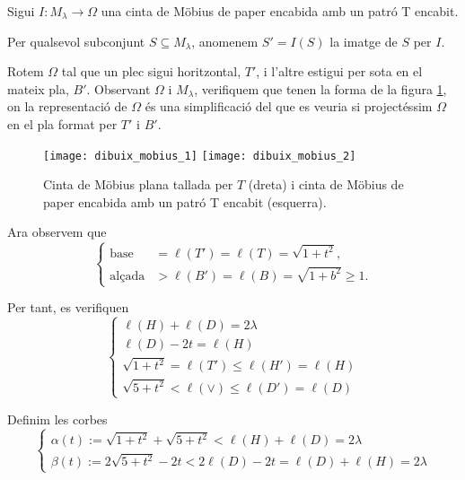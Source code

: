 Sigui $I:M_\lambda\to\Omega$ una cinta de Möbius de paper encabida amb un patró T encabit.
\begin{nota}
    Per qualsevol subconjunt $S\subseteq M_\lambda$, anomenem $S'=I(S)$ la imatge de $S$ per $I$.
\end{nota}

Rotem $\Omega$ tal que un plec sigui horitzontal, $T'$, i l'altre estigui per sota en el mateix pla, $B'$. Observant $\Omega$ i $M_\lambda$, verifiquem que tenen la forma de la figura \ref{fig:mobius_1}, on la representació de $\Omega$ és una simplificació del que es veuria si projectéssim $\Omega$ en el pla format per $T'$ i $B'$.

\begin{figure}[htbp]
    \centering
    \texttt{[image: dibuix\_mobius\_1]}
    \quad
    \quad
    \texttt{[image: dibuix\_mobius\_2]}
    \caption{Cinta de Möbius plana tallada per $T$ (dreta) i cinta de Möbius de paper encabida amb un patró T encabit (esquerra).}
    \label{fig:mobius_1}
\end{figure}

Ara observem que 
\begin{equation*}
    \begin{cases}
        \text{base} &= \ell(T') = \ell(T) = \sqrt{1+t^2},\\
        \text{alçada} &> \ell(B') = \ell(B) = \sqrt{1+b^2}\ge1.
    \end{cases}
\end{equation*}

Per tant, es verifiquen
\begin{equation*}
    \begin{cases}
        \ell(H) + \ell(D) = 2\lambda\\
        \ell(D)-2t=\ell(H)\\
        \sqrt{1+t^2}=\ell(T')\le\ell(H')=\ell(H)\\
        \sqrt{5+t^2}<\ell(\lor)\le\ell(D')=\ell(D)
    \end{cases}
\end{equation*}

Definim les corbes
\begin{equation*}
    \begin{cases}
        \alpha(t) := \sqrt{1+t^2} + \sqrt{5+t^2}<\ell(H) + \ell(D) = 2\lambda\\
        \beta(t) := 2\sqrt{5+t^2}-2t < 2\ell(D)-2t = \ell(D) + \ell(H) = 2\lambda
    \end{cases}
\end{equation*}

